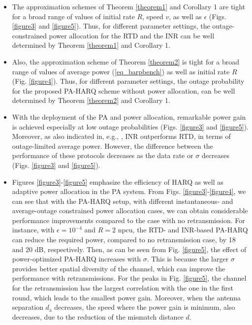 \begin{itemize}
    \item The approximation schemes of Theorem \ref{theorem1} and Corollary 1 are  tight for a broad range of values of initial rate $R$, speed $v$,  as well as $\epsilon$ (Figs. \ref{figure3} and \ref{figure5}). Thus, for different parameter settings, the outage-constrained power allocation for the RTD and the INR can be well determined by Theorem \ref{theorem1} and Corollary 1. 
    \item Also, the approximation scheme of Theorem \ref{theorem2} is tight for a broad range of values of average power (\ref{eq_barpbench}) as well as initial rate $R$ (Fig. \ref{figure4}). Thus, for different parameter settings, the outage probability for the proposed PA-HARQ scheme without power allocation, can be well determined by Theorem \ref{theorem2} and Corollary 1.
    \item With the deployment of the PA and power allocation, remarkable power gain is achieved especially at low outage probabilities  (Figs. \ref{figure3} and \ref{figure5}). Moreover,  as also indicated in, e.g.,  \cite{makki2014green}, INR outperforms RTD, in terms of outage-limited average power. However, the difference between the performance of these protocols decreases as the data rate or $\sigma$ decreases (Figs. \ref{figure3} and \ref{figure5}).
    \item Figures \ref{figure3}-\ref{figure5} emphasize the efficiency of HARQ as well as adaptive power allocation in the PA system. From Figs. \ref{figure3}-\ref{figure4}, we can see that with the PA-HARQ setup, with different instantaneous- and average-outage constrained power allocation cases, we can obtain considerable performance improvements compared to the case with no retransmission.  For instance, with $\epsilon=10^{-4}$ and $R = 2$ npcu, the RTD- and INR-based PA-HARQ can reduce the required power, compared to no retransmission case, by 18 and 20 dB, respectively. Then, as can be seen from Fig.  \ref{figure5}, the effect of power-optimized PA-HARQ increases with $\sigma$. This is because the larger $\sigma$ provides better spatial diversity of the channel, which can improve the performance with retransmissions. For the peaks in Fig. \ref{figure5}, the channel for the retransmission has the largest correlation with the one in the first round, which leads to the smallest power gain. Moreover, when the antenna separation $d_\text{a}$ decreases, the speed where the power gain is minimum, also decreases, due to the reduction of the mismatch distance $d$.
\end{itemize}



